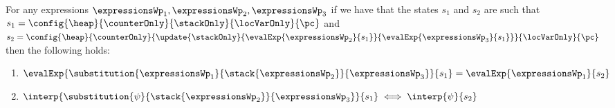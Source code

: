 %	  
%      


\begin{substStack}\label{substStack} 
For any expressions $ \expressionsWp_1, \expressionsWp_2, \expressionsWp_3 $ 
if we have that the states $s_1$ and $s_2$ are such that
 $s_1 =   \config{\heap}{\counterOnly}{ \stackOnly }{\locVarOnly}{\pc }$ and 
  $s_2 = \config{\heap}{\counterOnly}{ \update{\stackOnly}
                                                                 {\evalExp{\expressionsWp_2}{ s_1 } }
                                                                 { \evalExp{\expressionsWp_3}{ s_1  } } }{\locVarOnly}{\pc }$ then
 the following holds:
\begin{enumerate}
      \item  $     \evalExp{\substitution{\expressionsWp_1}{\stack{\expressionsWp_2}}{\expressionsWp_3}}{s_1 } = 
      \evalExp{\expressionsWp_1}{s_2 }$
      \item  $     \interp{\substitution{\psi}{\stack{\expressionsWp_2}}{\expressionsWp_3}}{s_1 } \iff
      \interp{\psi}{s_2 }$
\end{enumerate}
\end{substStack}

